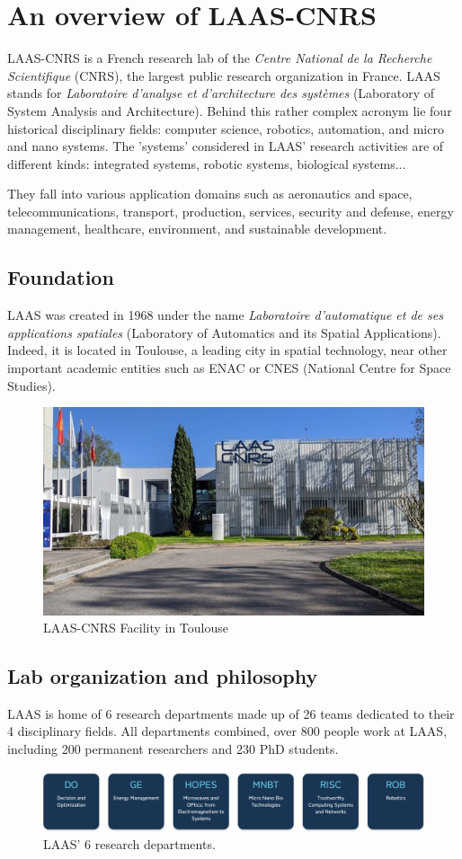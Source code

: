 \documentclass[a4paper,12pt]{article}
\theoremstyle{definition}
\theoremstyle{plain}
\begin{document}
\newpage
\section{An overview of LAAS-CNRS}

LAAS-CNRS is a French research lab of the \textit{Centre National de la Recherche Scientifique} (CNRS), the largest public research organization in France. LAAS stands for \textit{Laboratoire d'analyse et d'architecture des systèmes} (Laboratory of System Analysis and Architecture). Behind this rather complex acronym lie four historical disciplinary fields: computer science, robotics, automation, and micro and nano systems. The 'systems' considered in LAAS' research activities are of different kinds: integrated systems, robotic systems, biological systems...

They fall into various application domains such as aeronautics and space, telecommunications, transport, production, services, security and defense, energy management, healthcare, environment, and sustainable development.

\subsection{Foundation}
LAAS was created in 1968 under the name \textit{Laboratoire d'automatique et de ses applications spatiales} (Laboratory of Automatics and its Spatial Applications). Indeed, it is located in Toulouse, a leading city in spatial technology, near other important academic entities such as ENAC or CNES (National Centre for Space Studies).
\begin{figure}[H]
	\centering
	\includegraphics[width=0.4\linewidth]{figures/LAAS}
	\caption{LAAS-CNRS Facility in Toulouse}
	\label{fig:laas}
\end{figure}
\subsection{Lab organization and philosophy}
LAAS is home of 6 research departments made up of 26 teams dedicated to their 4 disciplinary fields.
All departments combined, over 800 people work at LAAS, including 200 permanent researchers and 230 PhD students.
\begin{figure}[H]
	\centering
	\includegraphics[width=0.6\linewidth]{figures/LAAS_Departments}
	\caption{LAAS' 6 research departments.}
	\label{fig:laasdepartments}
\end{figure}
\end{document}
